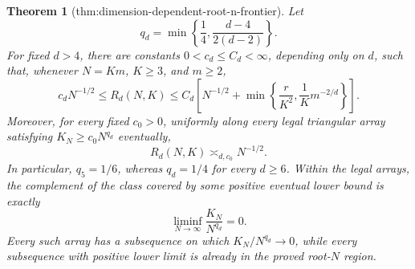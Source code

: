 \documentclass{article}
\newtheorem{theorem}{Theorem}
\begin{document}
\begin{theorem}[thm:dimension-dependent-root-n-frontier]\label{thm:dimension-dependent-root-n-frontier}
Let
\[
q_d=\min\left\{\frac14,\frac{d-4}{2(d-2)}\right\}.
\]
For fixed \(d>4\), there are constants \(0<c_d\le C_d<\infty\), depending only on \(d\), such that, whenever \(N=Km\), \(K\ge3\), and \(m\ge2\),
\[
c_dN^{-1/2}\le R_d(N,K)
\le C_d\left[N^{-1/2}+\min\left\{\frac r{K^2},\frac1K m^{-2/d}\right\}\right].
\]
Moreover, for every fixed \(c_0>0\), uniformly along every legal triangular array satisfying \(K_N\ge c_0N^{q_d}\) eventually,
\[
R_d(N,K)\asymp_{d,c_0}N^{-1/2}.
\]
In particular, \(q_5=1/6\), whereas \(q_d=1/4\) for every \(d\ge6\).
Within the legal arrays, the complement of the class covered by some positive eventual lower bound is exactly
\[
\liminf_{N\to\infty}\frac{K_N}{N^{q_d}}=0.
\]
Every such array has a subsequence on which \(K_N/N^{q_d}\to0\), while every subsequence with positive lower limit is already in the proved root-\(N\) region.
\end{theorem}
\end{document}
